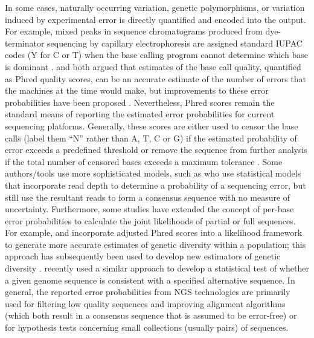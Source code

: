 \documentclass[12pt]{article}
\begin{document}
In some cases, naturally occurring variation, \ie genetic polymorphisms, or variation induced by experimental error is directly quantified and encoded into the output.
For example, mixed peaks in sequence chromatograms produced from dye-terminator sequencing by capillary electrophoresis are assigned standard IUPAC codes (\eg Y for C or T) when the base calling program cannot determine which base is dominant \cite{NomenclatureIncompletelySpecified1986}.
\cite{ewingBaseCallingAutomatedSequencer1998} and \cite{richterichEstimationErrorsRaw1998} both argued that estimates of the base call quality, quantified as Phred quality scores, can be an accurate estimate of the number of errors that the machines at the time would make, but improvements to these error probabilities have been proposed \cite{liAdjustQualityScores2004, liSNPDetectionMassively2009}. 
Nevertheless, Phred scores remain the standard means of reporting the estimated error probabilities for current sequencing platforms.
Generally, these scores are either used to censor the base calls (\ie label them ``N'' rather than A, T, C or G) if the estimated probability of error exceeds a predefined threshold or remove the sequence from further analysis if the total number of censored bases exceeds a maximum tolerance \cite[\eg ][]{doroninaPhylogeneticPositionEmended2005, robaskyRoleReplicatesError2014,oraweAccountingUncertaintyDNA2015}.
Some authors/tools use more sophisticated models, such as \cite{wuEstimatingErrorModels2017} who use statistical models that incorporate read depth to determine a probability of a sequencing error, but still use the resultant reads to form a consensus sequence with no measure of uncertainty.
Furthermore, some studies have extended the concept of per-base error probabilities to calculate the joint likelihoods of partial or full sequences.
For example, \cite{depristoFrameworkVariationDiscovery2011} and \cite{gompertHierarchicalBayesianModel2011} incorporate adjusted Phred scores into a likelihood framework to generate more accurate estimates of genetic diversity within a population; this approach has subsequently been used to develop new estimators of genetic diversity \cite{fumagalliQuantifyingPopulationGenetic2013a}. 
\cite{kuoEAGLEExplicitAlternative2018} recently used a similar approach to develop a statistical test of whether a given genome sequence is consistent with a specified alternative sequence.
In general, the reported error probabilities from NGS technologies are primarily used for filtering low quality sequences and improving alignment algorithms (which both result in a consensus sequence that is assumed to be error-free) or for hypothesis tests concerning small collections (usually pairs) of sequences.
\end{document}
